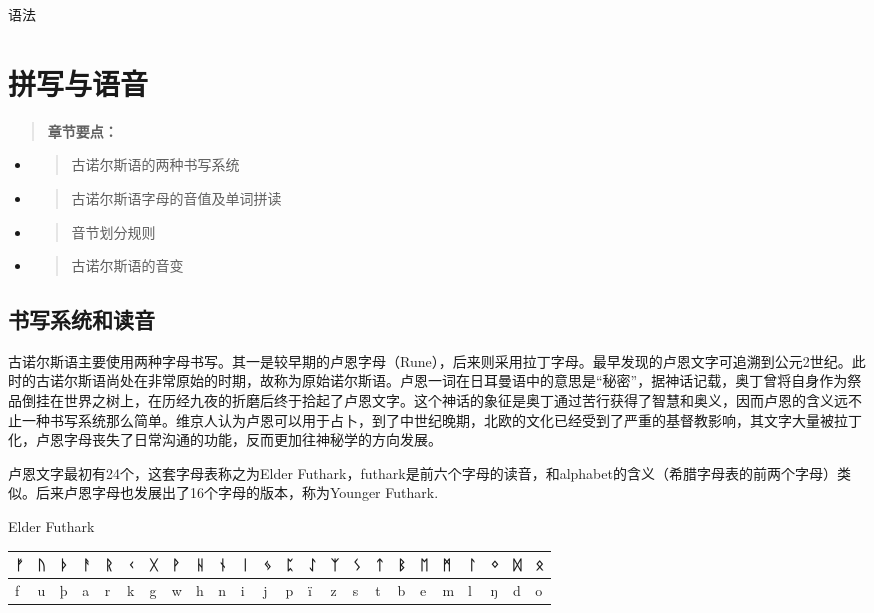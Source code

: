 语法

\chapter{拼写与语音}\label{拼写与语音}

\begin{quote}
  \textbf{章节要点：}
\end{quote}

\begin{itemize}
  \item
        \begin{quote}
          古诺尔斯语的两种书写系统
        \end{quote}
  \item
        \begin{quote}
          古诺尔斯语字母的音值及单词拼读
        \end{quote}
  \item
        \begin{quote}
          音节划分规则
        \end{quote}
  \item
        \begin{quote}
          古诺尔斯语的音变
        \end{quote}
\end{itemize}

\section{书写系统和读音}\label{书写系统和读音}

古诺尔斯语主要使用两种字母书写。其一是较早期的卢恩字母（Rune），后来则采用拉丁字母。最早发现的卢恩文字可追溯到公元2世纪。此时的古诺尔斯语尚处在非常原始的时期，故称为原始诺尔斯语。卢恩一词在日耳曼语中的意思是``秘密''，据神话记载，奥丁曾将自身作为祭品倒挂在世界之树上，在历经九夜的折磨后终于拾起了卢恩文字。这个神话的象征是奥丁通过苦行获得了智慧和奥义，因而卢恩的含义远不止一种书写系统那么简单。维京人认为卢恩可以用于占卜，到了中世纪晚期，北欧的文化已经受到了严重的基督教影响，其文字大量被拉丁化，卢恩字母丧失了日常沟通的功能，反而更加往神秘学的方向发展。

卢恩文字最初有24个，这套字母表称之为Elder
Futhark，futhark是前六个字母的读音，和alphabet的含义（希腊字母表的前两个字母）类似。后来卢恩字母也发展出了16个字母的版本，称为Younger
Futhark.

Elder Futhark

\begin{longtable}{llllllllllllllllllllllll}
  \toprule
  ᚠ & ᚢ & ᚦ & ᚨ & ᚱ & ᚲ & ᚷ & ᚹ & ᚺ & ᚾ & ᛁ & ᛃ & ᛈ & ᛇ & ᛉ & ᛊ & ᛏ & ᛒ & ᛖ & ᛗ & ᛚ & ᛜ & ᛞ & ᛟ \\
  \midrule
  \endhead
  \bottomrule
  \endfoot
  f & u & þ & a & r & k & g & w & h & n & i & j & p & ï & z & s & t & b &
  e & m & l & ŋ & d & o                                                                         \\
\end{longtable}

